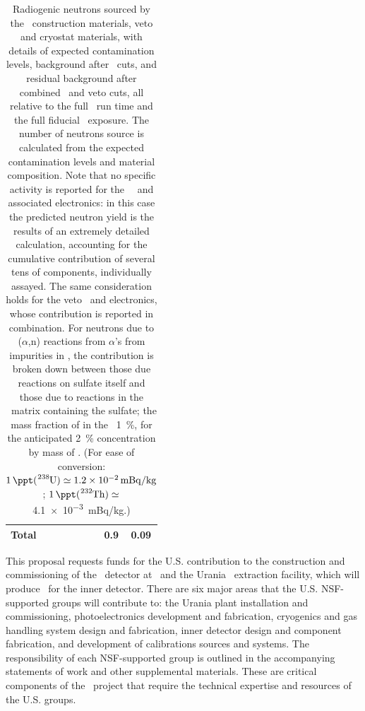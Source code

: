 \begin{table}[t]
\begin{tabular}{lccccccc}
\hline
{\bf Total}								&				&				&				&				&				&\num[math-rm=\mathbf]{0.9}
																																		&\num[math-rm=\mathbf]{0.09}\\ 
\hline
\end{tabular}
\caption[Radiogenic neutrons sourced by the detector construction materials and background before and after cuts.]{Radiogenic neutrons sourced by the \LArTPC\ construction materials, veto and cryostat materials, with details of expected contamination levels, background after \TPC\ cuts, and residual background after combined \TPC\ and veto cuts, all relative to the full \DSkExtendedRunTimePlanned\ run time and the full fiducial \DSkExtendedExposure\ exposure.  The number of neutrons source is calculated from the expected contamination levels and material composition.  Note that no specific activity is reported for the \TPC\ \SiPMs\ and associated electronics: in this case the predicted neutron yield is the results of an extremely detailed calculation, accounting for the cumulative contribution of several tens of components, individually assayed.  The same consideration holds for the veto \SiPMs\ and electronics, whose contribution is reported in combination.  For neutrons due to ($\alpha$,n) reactions from $\alpha$'s from impurities in , the contribution is broken down between those due reactions on  sulfate itself and those due to reactions in the \PMMA\ matrix containing the  sulfate; the mass fraction of  in the \GdAS\ \SI{1}{\percent}, for the anticipated \SI{2}{\percent} concentration by mass of .  (For ease of conversion: $\SI{1}{\ppt}(\ce{^238U}) \simeq \SI{1.2e-2}{mBq/kg}$; $\SI{1}{\ppt}(\ce{^232Th}) \simeq$ \SI{4.1e-3}{mBq/kg}.)}
\label{tab:NeutronBackground}
\end{table}

 
This proposal requests funds for the U.S. contribution to the construction and commissioning of the \DSks\ detector at \LNGS\ and the Urania \UAr\ extraction facility, which will produce \UAr\ for the inner detector. There are six major areas that the U.S. NSF-supported groups will contribute to: the Urania plant installation and commissioning, photoelectronics development and fabrication, cryogenics and gas handling system design and fabrication, inner detector design and component fabrication, and development of calibrations sources and systems.  The responsibility of each NSF-supported group is outlined in the accompanying statements of work and other supplemental materials. These are critical components of the \DSk\ project that require the technical expertise and resources of the U.S. groups.


